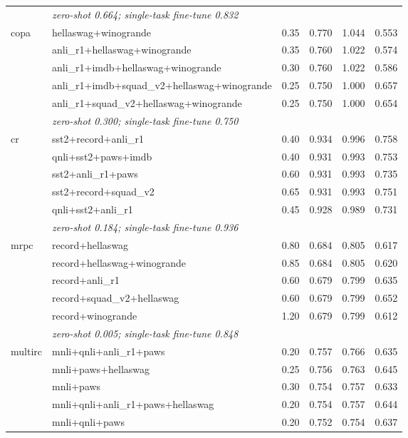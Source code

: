 \begin{table}[t]
\begin{tabular}{llrrrr}
    & \multicolumn{5}{l}{\textit{zero-shot 0.664; single-task fine-tune 0.832}} \\
    \addlinespace
    copa & hellaswag+winogrande & 0.35 & 0.770 & 1.044 & 0.553 \\
     & anli\_r1+hellaswag+winogrande & 0.35 & 0.760 & 1.022 & 0.574 \\
     & anli\_r1+imdb+hellaswag+winogrande & 0.30 & 0.760 & 1.022 & 0.586 \\
     & anli\_r1+imdb+squad\_v2+hellaswag+winogrande & 0.25 & 0.750 & 1.000 & 0.657 \\
     & anli\_r1+squad\_v2+hellaswag+winogrande & 0.25 & 0.750 & 1.000 & 0.654 \\
    & \multicolumn{5}{l}{\textit{zero-shot 0.300; single-task fine-tune 0.750}} \\
    \addlinespace
    cr & sst2+record+anli\_r1 & 0.40 & 0.934 & 0.996 & 0.758 \\
     & qnli+sst2+paws+imdb & 0.40 & 0.931 & 0.993 & 0.753 \\
     & sst2+anli\_r1+paws & 0.60 & 0.931 & 0.993 & 0.735 \\
     & sst2+record+squad\_v2 & 0.65 & 0.931 & 0.993 & 0.751 \\
     & qnli+sst2+anli\_r1 & 0.45 & 0.928 & 0.989 & 0.731 \\
    & \multicolumn{5}{l}{\textit{zero-shot 0.184; single-task fine-tune 0.936}} \\
    \addlinespace
    mrpc & record+hellaswag & 0.80 & 0.684 & 0.805 & 0.617 \\
     & record+hellaswag+winogrande & 0.85 & 0.684 & 0.805 & 0.620 \\
     & record+anli\_r1 & 0.60 & 0.679 & 0.799 & 0.635 \\
     & record+squad\_v2+hellaswag & 0.60 & 0.679 & 0.799 & 0.652 \\
     & record+winogrande & 1.20 & 0.679 & 0.799 & 0.612 \\
    & \multicolumn{5}{l}{\textit{zero-shot 0.005; single-task fine-tune 0.848}} \\
    \addlinespace
    multirc & mnli+qnli+anli\_r1+paws & 0.20 & 0.757 & 0.766 & 0.635 \\
     & mnli+paws+hellaswag & 0.25 & 0.756 & 0.763 & 0.645 \\
     & mnli+paws & 0.30 & 0.754 & 0.757 & 0.633 \\
     & mnli+qnli+anli\_r1+paws+hellaswag & 0.20 & 0.754 & 0.757 & 0.644 \\
     & mnli+qnli+paws & 0.20 & 0.752 & 0.754 & 0.637 \\

\end{tabular}
\end{table}
